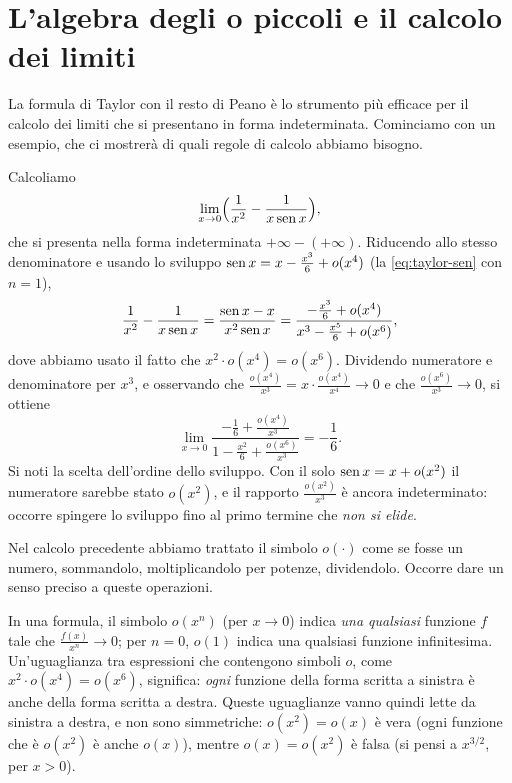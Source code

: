 \section{L'algebra degli o piccoli e il calcolo dei limiti}
\label{sec:o-piccoli}

La formula di Taylor con il resto di Peano è lo strumento più efficace per il calcolo
dei limiti che si presentano in forma indeterminata. Cominciamo con un esempio, che ci
mostrerà di quali regole di calcolo abbiamo bisogno.

\begin{esempio}\label{es:limite-taylor-1}
Calcoliamo
\begin{equation}\label{eq:limite-taylor-1}
  \lim_{x\to0}\Bigl(\frac1{x^{2}}-\frac1{x\operatorname{sen} x}\Bigr) ,
\end{equation}
che si presenta nella forma indeterminata $+\infty-(+\infty)$. Riducendo allo stesso
denominatore e usando lo sviluppo $\operatorname{sen} x=x-\frac{x^{3}}6+o(x^{4})$ (la \eqref{eq:taylor-sen} con
$n=1$),
\[
  \frac1{x^{2}}-\frac1{x\operatorname{sen} x}=\frac{\operatorname{sen} x-x}{x^{2}\operatorname{sen} x}
  =\frac{-\frac{x^{3}}6+o(x^{4})}{x^{3}-\frac{x^{5}}6+o(x^{6})} ,
\]
dove abbiamo usato il fatto che $x^{2}\cdot o(x^{4})=o(x^{6})$. Dividendo numeratore e
denominatore per $x^{3}$, e osservando che $\frac{o(x^{4})}{x^{3}}=x\cdot\frac{o(x^{4})}{x^{4}}\to0$ e che
$\frac{o(x^{6})}{x^{3}}\to0$, si ottiene
\[
  \lim_{x\to0}\frac{-\frac16+\frac{o(x^{4})}{x^{3}}}{1-\frac{x^{2}}6+\frac{o(x^{6})}{x^{3}}}=-\frac16 .
\]
Si noti la scelta dell'ordine dello sviluppo. Con il solo $\operatorname{sen} x=x+o(x^{2})$ il numeratore
sarebbe stato $o(x^{2})$, e il rapporto $\frac{o(x^{2})}{x^{3}}$ è ancora indeterminato: occorre
spingere lo sviluppo fino al primo termine che \emph{non si elide}.
\end{esempio}

Nel calcolo precedente abbiamo trattato il simbolo $o(\cdot)$ come se fosse un numero,
sommandolo, moltiplicandolo per potenze, dividendolo. Occorre dare un senso preciso a
queste operazioni.

\begin{notazione}
In una formula, il simbolo $o(x^{n})$ (per $x\to0$) indica \emph{una qualsiasi} funzione $f$
tale che $\frac{f(x)}{x^{n}}\to0$; per $n=0$, $o(1)$ indica una qualsiasi funzione infinitesima.
Un'uguaglianza tra espressioni che contengono simboli $o$, come $x^{2}\cdot o(x^{4})=o(x^{6})$,
significa: \emph{ogni} funzione della forma scritta a sinistra è anche della forma
scritta a destra. Queste uguaglianze vanno quindi lette da sinistra a destra, e non sono
simmetriche: $o(x^{2})=o(x)$ è vera (ogni funzione che è $o(x^{2})$ è anche $o(x)$), mentre
$o(x)=o(x^{2})$ è falsa (si pensi a $x^{3/2}$, per $x>0$).
\end{notazione}

